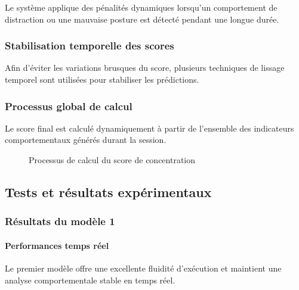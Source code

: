 Le système applique des pénalités dynamiques lorsqu’un comportement de distraction ou une mauvaise posture est détecté pendant une longue durée.


\subsubsection{Stabilisation temporelle des scores}

Afin d’éviter les variations brusques du score, plusieurs techniques de lissage temporel sont utilisées pour stabiliser les prédictions.


\subsubsection{Processus global de calcul}

Le score final est calculé dynamiquement à partir de l’ensemble des indicateurs comportementaux générés durant la session.

\begin{figure}[H]
    \centering
    \caption{Processus de calcul du score de concentration}
    \label{fig:score_calculation}
\end{figure}

\subsection{Tests et résultats expérimentaux}

\subsubsection{Résultats du modèle 1}

\paragraph{Performances temps réel}

Le premier modèle offre une excellente fluidité d’exécution et maintient une analyse comportementale stable en temps réel.


